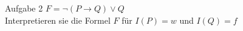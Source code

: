 \begin{frame}{Aufgabe 2}
	$F=\neg(P\rightarrow Q)\vee Q$\\
	Interpretieren sie die Formel $F$ für $I(P)=w$ und $I(Q)=f$\\
\end{frame}
